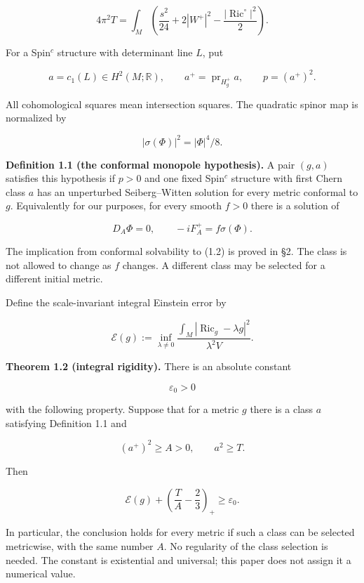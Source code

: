 \documentclass[
  10pt,
]{article}
\begin{document}
\[
 4\pi^2T=\int_M\left(\frac{s^2}{24}+2|W^+|^2
                          -\frac{|\operatorname{Ric}^{\circ}|^2}{2}\right).
 \tag{1.1}
\]

For a Spin\(^c\) structure with determinant line \(L\), put

\[
 a=c_1(L)\in H^2(M;\mathbb R),\qquad
 a^+=\operatorname{pr}_{H_g^+}a,\qquad p=(a^+)^2.
\]

All cohomological squares mean intersection squares. The quadratic
spinor map is normalized by

\[
 |\sigma(\Phi)|^2=|\Phi|^4/8.
\]

\textbf{Definition 1.1 (the conformal monopole hypothesis).} A pair
\((g,a)\) satisfies this hypothesis if \(p>0\) and one fixed Spin\(^c\)
structure with first Chern class \(a\) has an unperturbed
Seiberg--Witten solution for every metric conformal to \(g\).
Equivalently for our purposes, for every smooth \(f>0\) there is a
solution of

\[
 D_A\Phi=0,\qquad -iF_A^+=f\sigma(\Phi).                 \tag{1.2}
\]

The implication from conformal solvability to (1.2) is proved in §2. The
class is not allowed to change as \(f\) changes. A different class may
be selected for a different initial metric.

Define the scale-invariant integral Einstein error by

\[
 \mathcal E(g):=\inf_{\lambda\ne0}
  \frac{\int_M|\operatorname{Ric}_g-\lambda g|^2}
       {\lambda^2V}.                                      \tag{1.3}
\]

\textbf{Theorem 1.2 (integral rigidity).} There is an absolute constant

\[
                       \varepsilon_0>0                   \tag{1.4}
\]

with the following property. Suppose that for a metric \(g\) there is a
class \(a\) satisfying Definition 1.1 and

\[
                     (a^+)^2\ge A>0,\qquad a^2\ge T.
 \tag{1.5}
\]

Then

\[
 \boxed{\displaystyle
 \mathcal E(g)+\left(\frac TA-\frac23\right)_+
                         \ge\varepsilon_0.}              \tag{1.6}
\]

In particular, the conclusion holds for every metric if such a class can
be selected metricwise, with the same number \(A\). No regularity of the
class selection is needed. The constant is existential and universal;
this paper does not assign it a numerical value.
\end{document}
